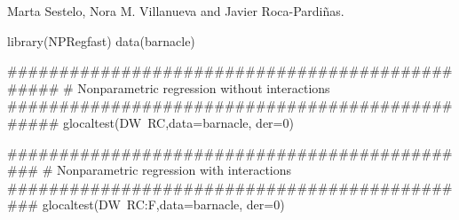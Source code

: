 %
\begin{Author}\relax
Marta Sestelo, Nora M. Villanueva and Javier Roca-Pardiñas.
\end{Author}
%
\begin{Examples}
\begin{ExampleCode}

library(NPRegfast)
data(barnacle)

################################################
# Nonparametric regression without interactions
################################################
glocaltest(DW~RC,data=barnacle, der=0)

##############################################
# Nonparametric regression with interactions
##############################################
glocaltest(DW~RC:F,data=barnacle, der=0)

\end{ExampleCode}
\end{Examples}

